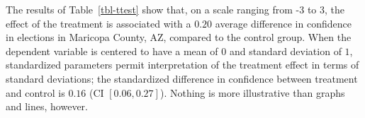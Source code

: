 \documentclass[
  12pt,
  letterpaper,
]{article}
\begin{document}
\begin{table}[H]

\caption{\label{tbl-ttest}Mean Difference of Treatment Compared to
Control Condition}


\end{table}%

The results of Table~\ref{tbl-ttest} show that, on a scale ranging from
-3 to 3, the effect of the treatment is associated with a \(0.20\)
average difference in confidence in elections in Maricopa County, AZ,
compared to the control group. When the dependent variable is centered
to have a mean of \(0\) and standard deviation of \(1\), standardized
parameters permit interpretation of the treatment effect in terms of
standard deviations; the standardized difference in confidence between
treatment and control is \(0.16\) (CI \([0.06, 0.27]\)). Nothing is more
illustrative than graphs and lines, however.
\end{document}
